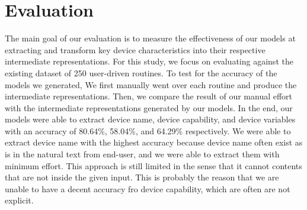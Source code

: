 \section{Evaluation}
\label{sec:eval}



The main goal of our evaluation is to measure the effectiveness of our models at extracting and transform key device characteristics into their respective intermediate representations. For this study, we focus on evaluating against the existing dataset of 250 user-driven routines.
To test for the accuracy of the models we generated, We first manually went over each routine and produce the intermediate representations. Then, we compare the result of our manual effort with the intermediate representations generated by our models. In the end, our models were able to extract device name, device capability, and device variables with an accuracy of 80.64\%, 58.04\%, and 64.29\% respectively. We were able to extract device name with the highest accuracy because device name often exist as is in the natural text from end-user, and we were able to extract them with minimum effort. This approach is still limited in the sense that it cannot contents that are not inside the given input. This is probably the reason that we are unable to have a decent accuracy fro device capability, which are often are not explicit.

